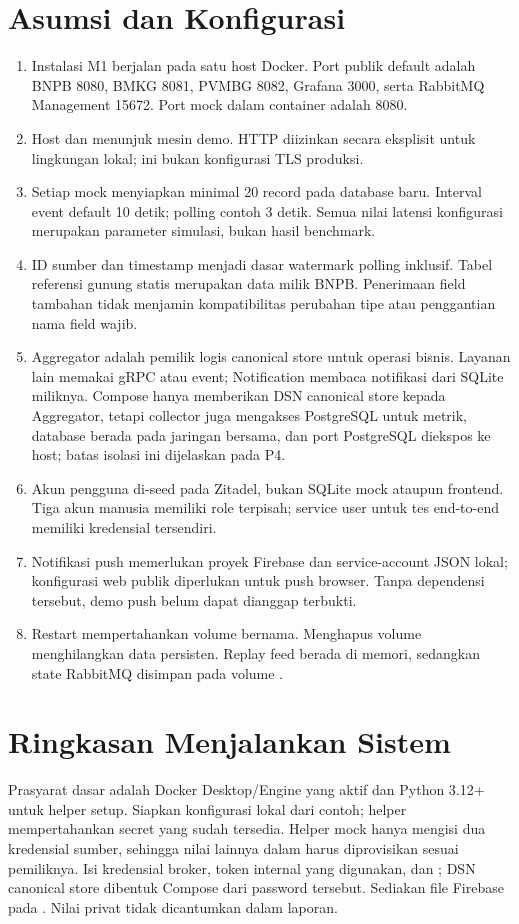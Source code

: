 \section{Asumsi dan Konfigurasi}
\begin{enumerate}
\item Instalasi M1 berjalan pada satu host Docker. Port publik default adalah BNPB 8080, BMKG 8081, PVMBG 8082, Grafana 3000, serta RabbitMQ Management 15672. Port mock dalam container adalah 8080.
\item Host  dan  menunjuk mesin demo. HTTP diizinkan secara eksplisit untuk lingkungan lokal; ini bukan konfigurasi TLS produksi.
\item Setiap mock menyiapkan minimal 20 record pada database baru. Interval event default 10 detik; polling contoh 3 detik. Semua nilai latensi konfigurasi merupakan parameter simulasi, bukan hasil benchmark.
\item ID sumber dan timestamp menjadi dasar watermark polling inklusif. Tabel referensi gunung statis merupakan data milik BNPB. Penerimaan field tambahan tidak menjamin kompatibilitas perubahan tipe atau penggantian nama field wajib.
\item Aggregator adalah pemilik logis canonical store untuk operasi bisnis. Layanan lain memakai gRPC atau event; Notification membaca notifikasi dari SQLite miliknya. Compose hanya memberikan DSN canonical store kepada Aggregator, tetapi collector juga mengakses PostgreSQL untuk metrik, database berada pada jaringan bersama, dan port PostgreSQL diekspos ke host; batas isolasi ini dijelaskan pada P4.
\item Akun pengguna di-seed pada Zitadel, bukan SQLite mock ataupun frontend. Tiga akun manusia memiliki role terpisah; service user untuk tes end-to-end memiliki kredensial tersendiri.
\item Notifikasi push memerlukan proyek Firebase dan service-account JSON lokal; konfigurasi web publik diperlukan untuk push browser. Tanpa dependensi tersebut, demo push belum dapat dianggap terbukti.
\item Restart mempertahankan volume bernama. Menghapus volume menghilangkan data persisten. Replay feed berada di memori, sedangkan state RabbitMQ disimpan pada volume .
\end{enumerate}

\section{Ringkasan Menjalankan Sistem}
Prasyarat dasar adalah Docker Desktop/Engine yang aktif dan Python 3.12+ untuk helper setup. Siapkan konfigurasi lokal dari contoh; helper mempertahankan secret yang sudah tersedia. Helper mock hanya mengisi dua kredensial sumber, sehingga nilai  lainnya dalam  harus diprovisikan sesuai pemiliknya. Isi kredensial broker, token internal yang digunakan, dan ; DSN canonical store dibentuk Compose dari password tersebut. Sediakan file Firebase pada . Nilai privat tidak dicantumkan dalam laporan.

